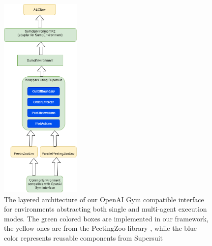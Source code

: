 \documentclass[a4paper,twoside]{article}
\begin{document}
\begin{figure}[!h]
	\includegraphics[width=0.35\textwidth]{environmentlayering.png}
	\centering
	\caption{The layered architecture of our OpenAI Gym compatible interface \cite{gym} for environments abstracting both single and multi-agent execution modes. The green colored boxes are implemented in our framework, the yellow ones are from the PeetingZoo library \cite{terry2020pettingzoo}, while the blue color represents reusable components from Supersuit \cite{SuperSuit}}
	\label{fig:environmentlayering}
\end{figure}
\end{document}
